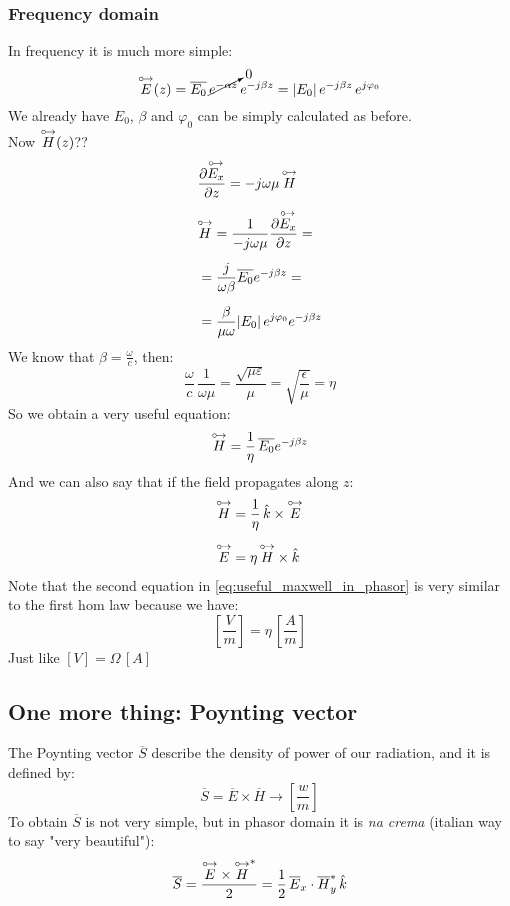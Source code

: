\subsubsection*{Frequency domain}
In frequency it is much more simple:
\begin{equation*}
    \overset{\mathbin {{\circ \mkern-2.5mu\rightarrow}}}{E}(z)=\overline{E_0}\,\cancelto{0}{e^{-\alpha z}}\,e^{-j\beta z}=|E_0|\,e^{-j\beta z}\,e^{j\varphi_0}
\end{equation*}
We already have $E_0$, $\beta$ and $\varphi_0$ can be simply calculated as before.\\
Now $\overset{\mathbin {{\circ \mkern-2.5mu\rightarrow}}}{H}(z)$??
\begin{align}
    \begin{split}
        &\frac{\partial \overset{\mathbin {{\circ \mkern-2.5mu\rightarrow}}}{E_x}}{\partial z}=-j\omega\mu\,\overset{\mathbin {{\circ \mkern-2.5mu\rightarrow}}}{H}\\[5pt]
        &\overset{\mathbin {{\circ \mkern-2.5mu\rightarrow}}}{H}=\frac{1}{-j\omega\mu}\frac{\partial \overset{\mathbin {{\circ \mkern-2.5mu\rightarrow}}}{E_x}}{\partial z}=\\[5pt]
        &=\frac{j}{\omega \beta}\overline{E_0}e^{-j\beta z}=\\[5pt]
        &=\frac{\beta}{\mu \omega}|E_0|\, e^{j\varphi_0}e^{-j\beta z}
    \end{split}
\end{align}
We know that $\beta = \frac{\omega}{c}$, then:
\begin{equation*}
    \frac{\omega}{c}\,\frac{1}{\omega \mu}=\frac{\sqrt{\mu \varepsilon}}{\mu}=\sqrt{\frac{\epsilon}{\mu}}=\eta 
\end{equation*}
So we obtain a very useful equation:
\begin{equation}
    \overset{\mathbin {{\circ \mkern-2.5mu\rightarrow}}}{H}=\frac{1}{\eta}\,\overline{E_0}e^{-j\beta z}
\end{equation}
And we can also say that if the field propagates along $z$:
\begin{align}\label{eq:useful_maxwell_in_phasor}
    \begin{split}
        \overset{\mathbin {{\circ \mkern-2.5mu\rightarrow}}}{H}&=\frac{1}{\eta}\,\hat{\mathnormal{k}} \times \overset{\mathbin {{\circ \mkern-2.5mu\rightarrow}}}{E}\\[5pt]
        \overset{\mathbin {{\circ \mkern-2.5mu\rightarrow}}}{E}&=\eta\,\overset{\mathbin {{\circ \mkern-2.5mu\rightarrow}}}{H}\times \hat{\mathnormal{k}}
    \end{split}
\end{align}
Note that the second equation in \cref{eq:useful_maxwell_in_phasor} is very similar to the first hom law because we have:
\begin{equation*}
    \left[\frac{V}{m}\right]=\eta\,\left[\frac{A}{m}\right]
\end{equation*}
Just like $\left[V\right]=\Omega \,\left[A\right]$
\subsection*{One more thing: Poynting vector}
The Poynting vector $\overline{S}$ describe the density of power of our radiation, and it is defined by:
\begin{equation}
    \overline{S}=\overline{E}\times\overline{H}\rightarrow\left[\frac{w}{m}\right]
\end{equation}
To obtain $\overline{S}$ is not very simple, but in phasor domain it is \emph{na crema} (italian way to say "very beautiful"):
\begin{equation}
    \overline{S}=\frac{\overset{\mathbin {{\circ \mkern-2.5mu\rightarrow}}}{E}\times\overset{\mathbin {{\circ \mkern-2.5mu\rightarrow}}}{H}^*}{2}=\frac{1}{2}\,\overline{E}
_x\cdot\overline{H}_y^*\,\hat{\mathnormal{k}}
\end{equation}